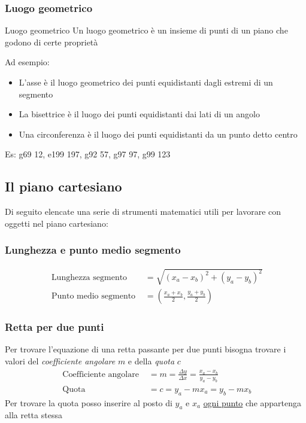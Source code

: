 \subsubsection{Luogo geometrico}
\begin{definizione}{Luogo geometrico}
	Un luogo geometrico è un insieme di punti di un piano che godono di certe proprietà
\end{definizione}
Ad esempio:
\begin{itemize}
	\item L'asse è il luogo geometrico dei punti equidistanti dagli estremi di un segmento
	\item La bisettrice è il luogo dei punti equidistanti dai lati di un angolo
	\item Una circonferenza è il luogo dei punti equidistanti da un punto detto centro
\end{itemize}

Es: g69 12, e199 197, g92 57, g97 97, g99 123

\subsection{Il piano cartesiano}
Di seguito elencate una serie di strumenti matematici utili per lavorare con oggetti nel piano cartesiano:
\subsubsection{Lunghezza e punto medio segmento}
\begin{align*}
	\text{ Lunghezza segmento }   & = \sqrt{\left( x_a - x_b\right)^2 + \left( y_a - y_b\right)^2 } \\
	\text{ Punto medio segmento } & = \left(\frac{x_a + x_b}{2}, \frac{y_a+y_b}{2}\right)
\end{align*}
\subsubsection{Retta per due punti}
Per trovare l'equazione di una retta passante per due punti bisogna trovare i valori del \textit{coefficiente angolare} $ m $ e della \textit{quota} $ c $
\begin{align*}
	\text{ Coefficiente angolare } & = m = \frac{\Delta y}{\Delta x} = \frac{x_a - x_b}{y_a - y_b} \\
	\text{ Quota }                 & = c = y_a - mx_a = y_b - mx_b
\end{align*}
Per trovare la quota posso inserire al posto di $ y_a $ e $ x_a $ \underline{ogni punto} che appartenga alla retta stessa
